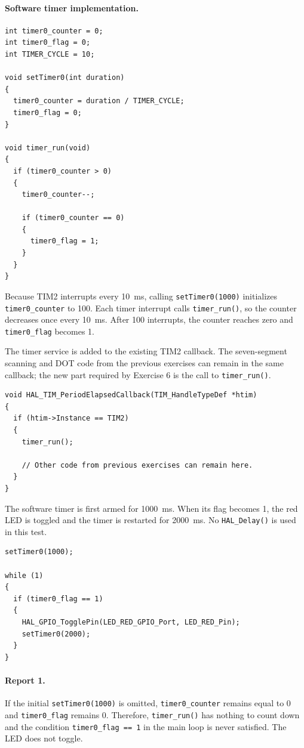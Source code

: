\paragraph{Software timer implementation.}

\begin{lstlisting}[caption={Software timer variables and functions used in Exercise 6}]
int timer0_counter = 0;
int timer0_flag = 0;
int TIMER_CYCLE = 10;

void setTimer0(int duration)
{
  timer0_counter = duration / TIMER_CYCLE;
  timer0_flag = 0;
}

void timer_run(void)
{
  if (timer0_counter > 0)
  {
    timer0_counter--;

    if (timer0_counter == 0)
    {
      timer0_flag = 1;
    }
  }
}
\end{lstlisting}

Because TIM2 interrupts every \SI{10}{ms}, calling \texttt{setTimer0(1000)} initializes \texttt{timer0\_counter} to 100. Each timer interrupt calls \texttt{timer\_run()}, so the counter decreases once every \SI{10}{ms}. After 100 interrupts, the counter reaches zero and \texttt{timer0\_flag} becomes 1.

The timer service is added to the existing TIM2 callback. The seven-segment scanning and DOT code from the previous exercises can remain in the same callback; the new part required by Exercise 6 is the call to \texttt{timer\_run()}.

\begin{lstlisting}[caption={Software timer service inside the TIM2 interrupt callback}]
void HAL_TIM_PeriodElapsedCallback(TIM_HandleTypeDef *htim)
{
  if (htim->Instance == TIM2)
  {
    timer_run();

    // Other code from previous exercises can remain here.
  }
}
\end{lstlisting}

The software timer is first armed for \SI{1000}{ms}. When its flag becomes 1, the red LED is toggled and the timer is restarted for \SI{2000}{ms}. No \texttt{HAL\_Delay()} is used in this test.

\begin{lstlisting}[caption={Using the software timer in the main loop}]
setTimer0(1000);

while (1)
{
  if (timer0_flag == 1)
  {
    HAL_GPIO_TogglePin(LED_RED_GPIO_Port, LED_RED_Pin);
    setTimer0(2000);
  }
}
\end{lstlisting}

\paragraph{Report 1.}
If the initial \texttt{setTimer0(1000)} is omitted, \texttt{timer0\_counter} remains equal to 0 and \texttt{timer0\_flag} remains 0. Therefore, \texttt{timer\_run()} has nothing to count down and the condition \texttt{timer0\_flag == 1} in the main loop is never satisfied. The LED does not toggle.

